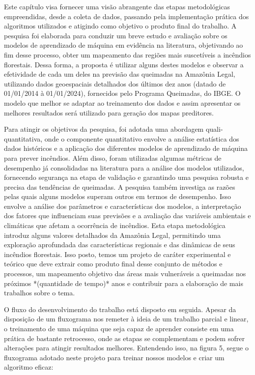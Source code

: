 Este capítulo visa fornecer uma visão abrangente das etapas metodológicas empreendidas, desde a coleta de dados, passando pela implementação prática dos algoritmos utilizados e atigindo como objetivo o produto final do trabalho. A pesquisa foi elaborada para conduzir um breve estudo e avaliação sobre os modelos de aprendizado de máquina em evidência na literatura, objetivando ao fim desse processo, obter um mapeamento das regiões mais suscetíveis a incêndios florestais. Dessa forma, a proposta é utilizar alguns destes modelos e observar a efetividade de cada um deles na previsão das queimadas na Amazônia Legal, utilizando dados geoespaciais detalhados dos últimos dez anos (datado de 01/01/2014 à 01/01/2024), fornecidos pelo Programa Queimadas, do IBGE. O modelo que melhor se adaptar ao treinamento dos dados e assim apresentar os melhores resultados será utilizado para geração dos mapas preditores.

Para atingir os objetivos da pesquisa, foi adotada uma abordagem quali-quantitativa, onde o componente quantitativo envolve a análise estatística dos dados históricos e a aplicação dos diferentes modelos de aprendizado de máquina para prever incêndios. Além disso, foram utilizadas algumas métricas de desempenho já consolidadas na literatura para a análise dos modelos utilizados, fornecendo segurança na etapa de validação e garantindo uma pesquisa robusta e precisa das tendências de queimadas. A pesquisa também investiga as razões pelas quais alguns modelos superam outros em termos de desempenho. Isso envolve a análise dos parâmetros e características dos modelos, a interpretação dos fatores que influenciam suas previsões e a avaliação das variáveis ambientais e climáticas que afetam a ocorrência de incêndios. Esta etapa metodológica introduz alguns valores detalhados da Amazônia Legal, permitindo uma exploração aprofundada das características regionais e das dinâmicas de seus incêndios florestais. Isso posto, temos um projeto de caráter experimental e teórico que deve extrair como produto final desse conjunto de métodos e processos, um mapeamento objetivo das áreas mais vulneráveis a queimadas nos próximos *(quantidade de tempo)* anos e contribuir para a elaboração de mais trabalhos sobre o tema.

O fluxo do desenvolvimento do trabalho está disposto em seguida. Apesar da disposição de um fluxograma nos remeter à ideia de um trabalho parcial e linear, o treinamento de uma máquina que seja capaz de aprender consiste em uma prática de bastante retrocesso, onde as etapas se complementam e podem sofrer alterações para atingir resultados melhores. Entendendo isso, na figura 5, segue o fluxograma adotado neste projeto para treinar nossos modelos e criar um algoritmo eficaz:


